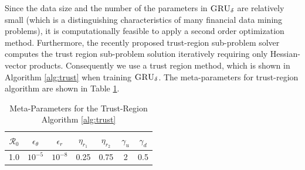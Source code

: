 \documentclass[letterpaper,12pt,titlepage,oneside,final]{book}
\numberwithin{equation}{section}
\theoremstyle{definition}
\newcommand{\model}{\textsc{GRU}_\delta}
\begin{document}
Since the data size and the number of the parameters in $\model$ are relatively small (which is a distinguishing characteristics of many financial data mining  problems), it is computationally feasible to apply a second order optimization method.  Furthermore, the recently proposed trust-region sub-problem solver \citep{lenders2018trlib} computes the trust region sub-problem solution iteratively requiring only Hessian-vector products. %
Consequently we use a trust region method, which is shown in Algorithm \ref{alg:trust} when training $\model$.  The meta-parameters for trust-region algorithm are shown in Table \ref{para2}. 
\begin{table}[htp!]
	\begin{center}
	\begin{tabular}{|c|c|c|c|c|c|c|}
	\hline
	$\mathcal{R}_0$&
	$\epsilon_{\theta}$& 
	$\epsilon_{r}$&
	$\eta_{r_1}$&
	$\eta_{r_2}$&
	$\gamma_u$&
	$\gamma_d$  \\ \hline
	 1.0&$10^{-5}$&$10^{-8}$&0.25&0.75 &2 & 0.5  \\    \hline
	\end{tabular}
	\end{center}
	
	\caption{Meta-Parameters for the Trust-Region Algorithm \ref{alg:trust}}
	\label{para2}
	\end{table}
\end{document}
